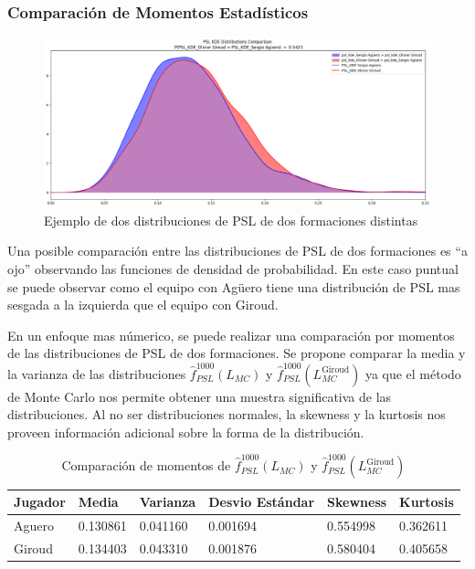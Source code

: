 \documentclass[
  a4paper,
]{article}
\begin{document}
\hypertarget{comparaciuxf3n-de-momentos-estaduxedsticos}{%
\subsubsection{Comparación de Momentos
Estadísticos}\label{comparaciuxf3n-de-momentos-estaduxedsticos}}

\begin{figure}
  \includegraphics{./recursos_pdf/graficos/psl_dists_aguero_v_giroud.png}
    \caption{Ejemplo de dos distribuciones de PSL de dos formaciones distintas}
\end{figure}

Una posible comparación entre las distribuciones de PSL de dos
formaciones es ``a ojo'' observando las funciones de densidad de
probabilidad. En este caso puntual se puede observar como el equipo con
Agüero tiene una distribución de PSL mas sesgada a la izquierda que el
equipo con Giroud.

En un enfoque mas númerico, se puede realizar una comparación por
momentos de las distribuciones de PSL de dos formaciones. Se propone
comparar la media y la varianza de las distribuciones
\(\hat{f}^{1000}_{PSL}(L_{MC})\) y
\(\hat{f}^{1000}_{PSL}(L_{MC}^{\text{Giroud}})\) ya que el método de
Monte Carlo nos permite obtener una muestra significativa de las
distribuciones. Al no ser distribuciones normales, la skewness y la
kurtosis nos proveen información adicional sobre la forma de la
distribución.

\begin{table}
\caption{Comparación de momentos de $\hat{f}^{1000}_{PSL}(L_{MC})$ y $\hat{f}^{1000}_{PSL}(L_{MC}^{\text{Giroud}})$}
\label{tab:comparacion_momentos_psl}
\begin{center}
\begin{tabular}{llllll}
\toprule
Jugador & Media & Varianza & Desvio Estándar & Skewness & Kurtosis \\
\midrule
Aguero & 0.130861 & 0.041160 & 0.001694 & 0.554998 & 0.362611 \\
Giroud & 0.134403 & 0.043310 & 0.001876 & 0.580404 & 0.405658 \\
\bottomrule
\end{tabular}
\end{center}
\end{table}
\end{document}
